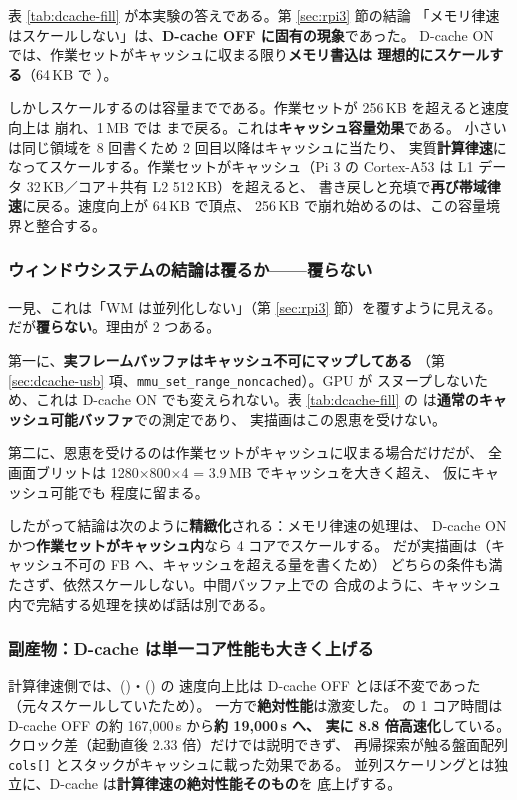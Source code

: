 \noindent
表 \ref{tab:dcache-fill} が本実験の答えである。第 \ref{sec:rpi3} 節の結論
「メモリ律速はスケールしない」は、\textbf{D-cache OFF に固有の現象}であった。
D-cache ON では、作業セットがキャッシュに収まる限り\textbf{メモリ書込は
理想的にスケールする}（64\,KB で ）。

しかしスケールするのは容量までである。作業セットが 256\,KB を超えると速度向上は
崩れ、1\,MB では  まで戻る。これは\textbf{キャッシュ容量効果}である。
小さい  は同じ領域を 8 回書くため 2 回目以降はキャッシュに当たり、
実質\textbf{計算律速}になってスケールする。作業セットがキャッシュ（Pi 3 の
Cortex-A53 は L1 データ 32\,KB／コア＋共有 L2 512\,KB）を超えると、
書き戻しと充填で\textbf{再び帯域律速}に戻る。速度向上が 64\,KB で頂点、
256\,KB で崩れ始めるのは、この容量境界と整合する。

\subsubsection*{ウィンドウシステムの結論は覆るか——覆らない}

一見、これは「WM は並列化しない」（第 \ref{sec:rpi3} 節）を覆すように見える。
だが\textbf{覆らない}。理由が 2 つある。

第一に、\textbf{実フレームバッファはキャッシュ不可にマップしてある}
（第 \ref{sec:dcache-usb} 項、\texttt{mmu\_set\_range\_noncached}）。GPU が
スヌープしないため、これは D-cache ON でも変えられない。表 \ref{tab:dcache-fill}
の  は\textbf{通常のキャッシュ可能バッファ}での測定であり、
実描画はこの恩恵を受けない。

第二に、恩恵を受けるのは作業セットがキャッシュに収まる場合だけだが、
全画面ブリットは 1280$\times$800$\times$4 = 3.9\,MB でキャッシュを大きく超え、
仮にキャッシュ可能でも  程度に留まる。

したがって結論は次のように\textbf{精緻化}される：メモリ律速の処理は、
D-cache ON かつ\textbf{作業セットがキャッシュ内}なら 4 コアでスケールする。
だが実描画は（キャッシュ不可の FB へ、キャッシュを超える量を書くため）
どちらの条件も満たさず、依然スケールしない。中間バッファ上での
合成のように、キャッシュ内で完結する処理を挟めば話は別である。

\subsubsection*{副産物：D-cache は単一コア性能も大きく上げる}

計算律速側では、()・() の
速度向上比は D-cache OFF とほぼ不変であった（元々スケールしていたため）。
一方で\textbf{絶対性能}は激変した。 の 1 コア時間は
D-cache OFF の約 167{,}000\,\textmu s から\textbf{約 19{,}000\,\textmu s へ、
実に 8.8 倍高速化}している。クロック差（起動直後 2.33 倍）だけでは説明できず、
再帰探索が触る盤面配列 \texttt{cols[]} とスタックがキャッシュに載った効果である。
並列スケーリングとは独立に、D-cache は\textbf{計算律速の絶対性能そのもの}を
底上げする。

